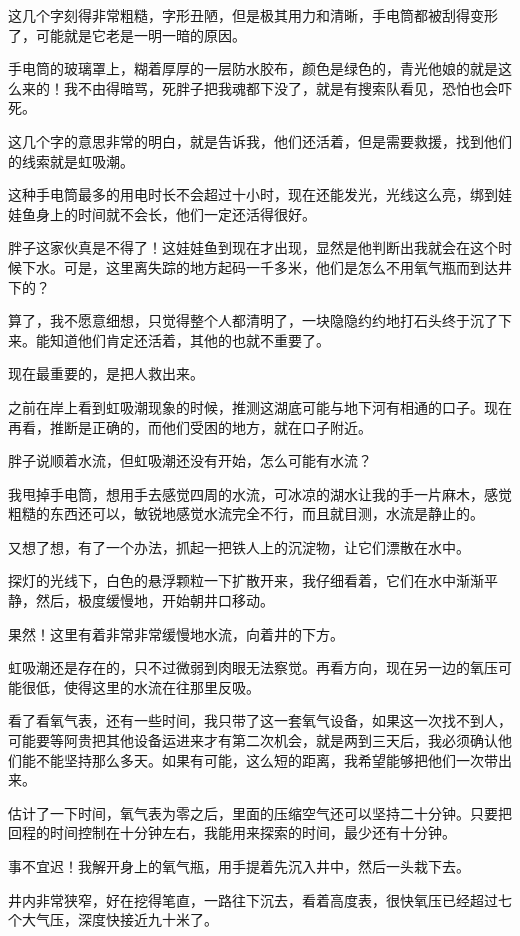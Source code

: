 这几个字刻得非常粗糙，字形丑陋，但是极其用力和清晰，手电筒都被刮得变形了，可能就是它老是一明一暗的原因。

手电筒的玻璃罩上，糊着厚厚的一层防水胶布，颜色是绿色的，青光他娘的就是这么来的！我不由得暗骂，死胖子把我魂都下没了，就是有搜索队看见，恐怕也会吓死。

这几个字的意思非常的明白，就是告诉我，他们还活着，但是需要救援，找到他们的线索就是虹吸潮。

这种手电筒最多的用电时长不会超过十小时，现在还能发光，光线这么亮，绑到娃娃鱼身上的时间就不会长，他们一定还活得很好。

胖子这家伙真是不得了！这娃娃鱼到现在才出现，显然是他判断出我就会在这个时候下水。可是，这里离失踪的地方起码一千多米，他们是怎么不用氧气瓶而到达井下的？

算了，我不愿意细想，只觉得整个人都清明了，一块隐隐约约地打石头终于沉了下来。能知道他们肯定还活着，其他的也就不重要了。

现在最重要的，是把人救出来。

之前在岸上看到虹吸潮现象的时候，推测这湖底可能与地下河有相通的口子。现在再看，推断是正确的，而他们受困的地方，就在口子附近。

胖子说顺着水流，但虹吸潮还没有开始，怎么可能有水流？

我甩掉手电筒，想用手去感觉四周的水流，可冰凉的湖水让我的手一片麻木，感觉粗糙的东西还可以，敏锐地感觉水流完全不行，而且就目测，水流是静止的。

又想了想，有了一个办法，抓起一把铁人上的沉淀物，让它们漂散在水中。

探灯的光线下，白色的悬浮颗粒一下扩散开来，我仔细看着，它们在水中渐渐平静，然后，极度缓慢地，开始朝井口移动。

果然！这里有着非常非常缓慢地水流，向着井的下方。

虹吸潮还是存在的，只不过微弱到肉眼无法察觉。再看方向，现在另一边的氧压可能很低，使得这里的水流在往那里反吸。

看了看氧气表，还有一些时间，我只带了这一套氧气设备，如果这一次找不到人，可能要等阿贵把其他设备运进来才有第二次机会，就是两到三天后，我必须确认他们能不能坚持那么多天。如果有可能，这么短的距离，我希望能够把他们一次带出来。

估计了一下时间，氧气表为零之后，里面的压缩空气还可以坚持二十分钟。只要把回程的时间控制在十分钟左右，我能用来探索的时间，最少还有十分钟。

事不宜迟！我解开身上的氧气瓶，用手提着先沉入井中，然后一头栽下去。

井内非常狭窄，好在挖得笔直，一路往下沉去，看着高度表，很快氧压已经超过七个大气压，深度快接近九十米了。

